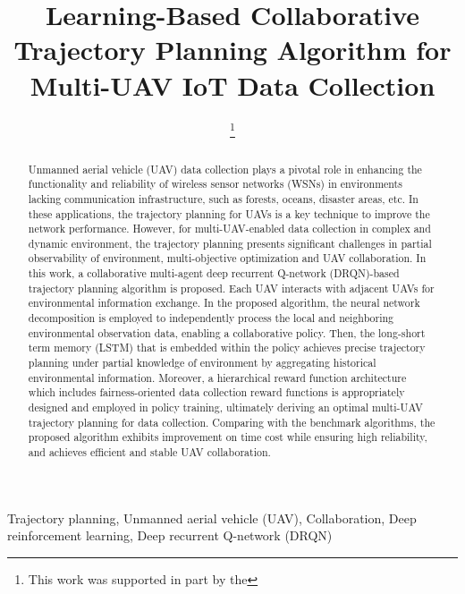 \documentclass[journal]{IEEEtran}
\begin{document}
\title{Learning-Based Collaborative Trajectory Planning Algorithm for Multi-UAV IoT Data Collection}
\author{
\thanks{
	This work was supported in part by the 
}}

%
{  }

\maketitle

\begin{abstract}
Unmanned aerial vehicle (UAV) data collection plays a pivotal role in enhancing the functionality and reliability of wireless sensor networks (WSNs) in environments lacking communication infrastructure, such as forests, oceans, disaster areas, etc. In these applications, the trajectory planning for UAVs is a key technique to improve the network performance. However, for multi-UAV-enabled data collection in complex and dynamic environment, the trajectory planning presents significant challenges in partial observability of environment, multi-objective optimization and UAV collaboration. In this work, a collaborative multi-agent deep recurrent Q-network (DRQN)-based trajectory planning algorithm is proposed. Each UAV interacts with adjacent UAVs for environmental information exchange. In the proposed algorithm, the neural network decomposition is employed to independently process the local and neighboring environmental observation data, enabling a collaborative policy. Then, the long-short term memory (LSTM) that is embedded within the policy achieves precise trajectory planning under partial knowledge of environment by aggregating historical environmental information. Moreover, a hierarchical reward function architecture which includes fairness-oriented data collection reward functions is appropriately designed and employed in policy training, ultimately deriving an optimal multi-UAV trajectory planning for data collection. Comparing with the benchmark algorithms, the proposed algorithm exhibits improvement on time cost while ensuring high reliability, and achieves efficient and stable UAV collaboration. 
\end{abstract}

\begin{IEEEkeywords}
Trajectory planning, Unmanned aerial vehicle (UAV), Collaboration, Deep reinforcement learning, Deep recurrent Q-network (DRQN)
\end{IEEEkeywords}
\end{document}
